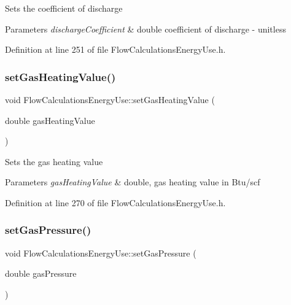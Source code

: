Sets the coefficient of discharge


\begin{DoxyParams}{Parameters}
{\em discharge\+Coefficient} & double coefficient of discharge -\/ unitless \\
\hline
\end{DoxyParams}


Definition at line 251 of file Flow\+Calculations\+Energy\+Use.\+h.

\mbox{\label{class_flow_calculations_energy_use_ae51a954fb1f44d6b114f66e69bdf754e}} 
\subsubsection{\texorpdfstring{set\+Gas\+Heating\+Value()}{setGasHeatingValue()}}
{\footnotesize\ttfamily void Flow\+Calculations\+Energy\+Use\+::set\+Gas\+Heating\+Value (\begin{DoxyParamCaption}\item[{double}]{gas\+Heating\+Value }\end{DoxyParamCaption})\hspace{0.3cm}{\ttfamily [inline]}}

Sets the gas heating value


\begin{DoxyParams}{Parameters}
{\em gas\+Heating\+Value} & double, gas heating value in Btu/scf \\
\hline
\end{DoxyParams}


Definition at line 270 of file Flow\+Calculations\+Energy\+Use.\+h.

\mbox{\label{class_flow_calculations_energy_use_a3b87a7c24340c618ed62ced5aece36b2}} 
\subsubsection{\texorpdfstring{set\+Gas\+Pressure()}{setGasPressure()}}
{\footnotesize\ttfamily void Flow\+Calculations\+Energy\+Use\+::set\+Gas\+Pressure (\begin{DoxyParamCaption}\item[{double}]{gas\+Pressure }\end{DoxyParamCaption})\hspace{0.3cm}{\ttfamily [inline]}}

